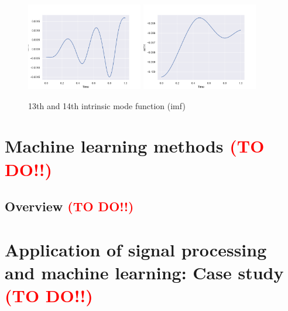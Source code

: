 \documentclass[11pt, oneside]{article}   	%
\begin{document}
\begin{flushleft}
\begin{figure}[H] %
   \centering
   \includegraphics[width=2in]{imf/imf13.png} 
     \includegraphics[width=2in]{imf/imf14.png} 
   \caption{13th and 14th intrinsic mode function (imf)}
   \label{fig:imf1314}
\end{figure}

\end{flushleft}


\section{Machine learning methods   \textcolor{red}{(TO DO!!)}}
\subsection{Overview   \textcolor{red}{(TO DO!!)}}




\section{Application of signal processing and machine learning: Case study   \textcolor{red}{(TO DO!!)}}
\end{document}
